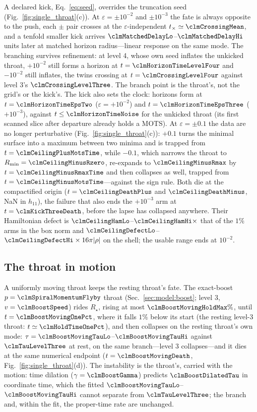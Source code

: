 \documentclass[twocolumn,floatfix,aps,prd,superscriptaddress,nofootinbib]{revtex4-2}
\begin{document}
A declared kick, Eq.~\eqref{eq:seed}, overrides the truncation seed (Fig.~\ref{fig:single_throat}(c)). At $\varepsilon=\pm10^{-2}$ and $\pm10^{-3}$ the fate is always opposite to the push, each $\pm$ pair crosses at the $\varepsilon$-independent $t_\times\simeq\clmCrossingMean$, and a tenfold smaller kick arrives $\clmMatchedDelayLo$--$\clmMatchedDelayHi$ units later at matched horizon radius---linear response on the same mode. The branching survives refinement: at level 4, whose own seed inflates the unkicked throat, $+10^{-2}$ still forms a horizon at $t=\clmHorizonTimeLevelFour$ and $-10^{-2}$ still inflates, the twins crossing at $t=\clmCrossingLevelFour$ against level 3's $\clmCrossingLevelThree$. The branch point is the throat's, not the grid's or the kick's. The kick also sets the clock: horizons form at $t=\clmHorizonTimeEpsTwo$ ($\varepsilon=+10^{-2}$) and $t=\clmHorizonTimeEpsThree$ ($+10^{-3}$), against $t\le\clmHorizonTimeNoise$ for the unkicked throat (its first scanned slice after departure already holds a MOTS). At $\varepsilon=\pm0.1$ the data are no longer perturbative (Fig.~\ref{fig:single_throat}(c)): $+0.1$ turns the minimal surface into a maximum between two minima and is trapped from $t=\clmCeilingPlusMotsTime$, while $-0.1$, which narrows the throat to $R_{\min}=\clmCeilingMinusRzero$, re-expands to $\clmCeilingMinusRmax$ by $t=\clmCeilingMinusRmaxTime$ and then collapses as well, trapped from $t=\clmCeilingMinusMotsTime$---against the sign rule. Both die at the compactified origin ($t=\clmCeilingDeathPlus$ and $\clmCeilingDeathMinus$, NaN in $h_{11}$), the failure that also ends the $+10^{-3}$ arm at $t=\clmKickThreeDeath$, before the lapse has collapsed anywhere. Their Hamiltonian defect is $\clmCeilingHamLo$--$\clmCeilingHamHi\times$ that of the $1\%$ arms in the box norm and $\clmCeilingDefectLo$--$\clmCeilingDefectHi\times16\pi|\rho|$ on the shell; the usable range ends at $10^{-2}$.

\subsection{The throat in motion}
\label{sec:single:moving}

A uniformly moving throat keeps the resting throat's fate. The exact-boost $p=\clmSpiralMomentumFlyby$ throat (Sec.~\ref{sec:model:boost}; level 3, $v=\clmBoostSpeed$) rides $R_\star$, rising at most $\clmBoostMovingHoldMax\%$, until $t=\clmBoostMovingOnePct$, where it falls $1\%$ below its start (the resting level-3 throat: $t\simeq\clmHoldTimeOnePct$), and then collapses on the resting throat's own mode: $\tau=\clmBoostMovingTauLo$--$\clmBoostMovingTauHi$ against $\clmTauLevelThree$ at rest, on the same branch---level 3 collapses---and it dies at the same numerical endpoint ($t=\clmBoostMovingDeath$, Fig.~\ref{fig:single_throat}(d)). The instability is the throat's, carried with the motion: time dilation ($\gamma=\clmBoostGamma$) predicts $\clmBoostDilatedTau$ in coordinate time, which the fitted $\clmBoostMovingTauLo$--$\clmBoostMovingTauHi$ cannot separate from $\clmTauLevelThree$; the branch and, within the fit, the proper-time rate are unchanged.
\end{document}
